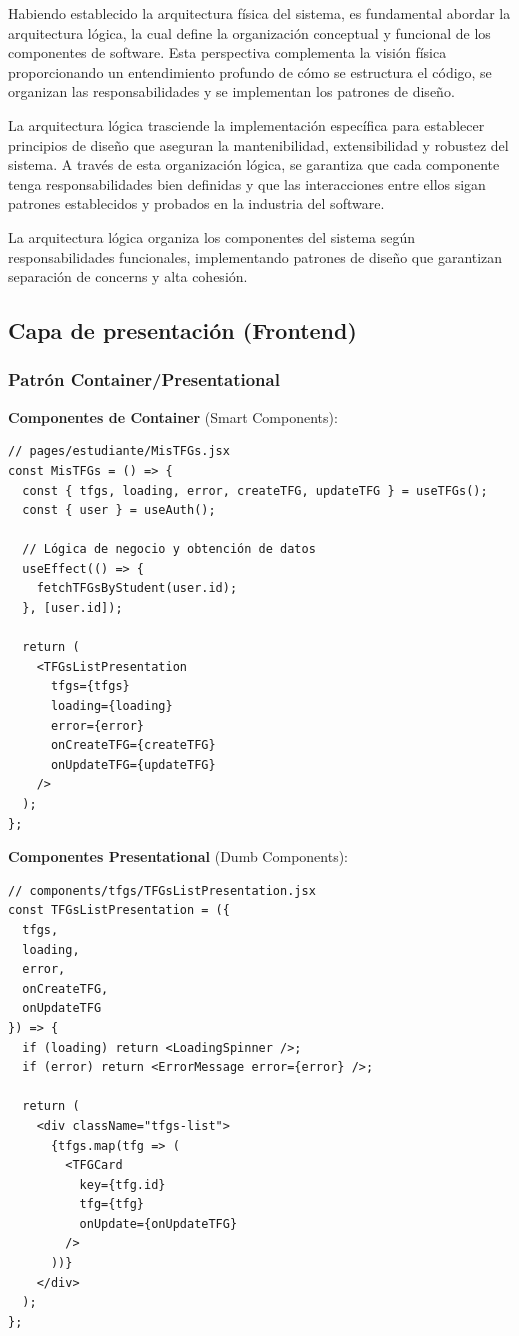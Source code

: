 \documentclass[12pt,a4paper,oneside]{report}
\begin{document}
Habiendo establecido la arquitectura física del sistema, es fundamental
abordar la arquitectura lógica, la cual define la organización
conceptual y funcional de los componentes de software. Esta perspectiva
complementa la visión física proporcionando un entendimiento profundo de
cómo se estructura el código, se organizan las responsabilidades y se
implementan los patrones de diseño.

La arquitectura lógica trasciende la implementación específica para
establecer principios de diseño que aseguran la mantenibilidad,
extensibilidad y robustez del sistema. A través de esta organización
lógica, se garantiza que cada componente tenga responsabilidades bien
definidas y que las interacciones entre ellos sigan patrones
establecidos y probados en la industria del software.

La arquitectura lógica organiza los componentes del sistema según
responsabilidades funcionales, implementando patrones de diseño que
garantizan separación de concerns y alta cohesión.

\subsection{Capa de presentación
(Frontend)}\label{capa-de-presentaciuxf3n-frontend}

\subsubsection{Patrón
Container/Presentational}\label{patruxf3n-containerpresentational}

\textbf{Componentes de Container} (Smart Components):

\begin{lstlisting}
// pages/estudiante/MisTFGs.jsx
const MisTFGs = () => {
  const { tfgs, loading, error, createTFG, updateTFG } = useTFGs();
  const { user } = useAuth();
  
  // Lógica de negocio y obtención de datos
  useEffect(() => {
    fetchTFGsByStudent(user.id);
  }, [user.id]);
  
  return (
    <TFGsListPresentation 
      tfgs={tfgs}
      loading={loading}
      error={error}
      onCreateTFG={createTFG}
      onUpdateTFG={updateTFG}
    />
  );
};
\end{lstlisting}

\textbf{Componentes Presentational} (Dumb Components):

\begin{lstlisting}
// components/tfgs/TFGsListPresentation.jsx
const TFGsListPresentation = ({ 
  tfgs, 
  loading, 
  error, 
  onCreateTFG, 
  onUpdateTFG 
}) => {
  if (loading) return <LoadingSpinner />;
  if (error) return <ErrorMessage error={error} />;
  
  return (
    <div className="tfgs-list">
      {tfgs.map(tfg => (
        <TFGCard 
          key={tfg.id} 
          tfg={tfg} 
          onUpdate={onUpdateTFG} 
        />
      ))}
    </div>
  );
};
\end{lstlisting}
\end{document}
